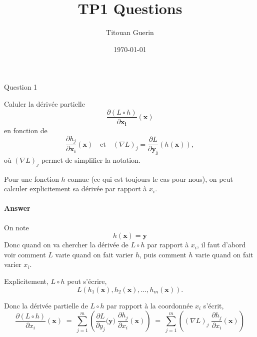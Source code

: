 \documentclass[12pt,a4paper]{article}
\title{TP1 Questions}
\author{Titouan Guerin}
\date{\today}
\begin{document}
\begin{section}{Question 1}

Caluler la dérivée partielle 
\[
\frac{\partial (L \circ h)}{\partial \mathbf{x_i}}(\mathbf{x})
\]
en fonction de 
\[
\frac{\partial h_j}{\partial \mathbf{x_i}}(\mathbf{x})
\quad \text{et} \quad
(\nabla L)_j = \frac{\partial L}{\partial \mathbf{y_j}}(h(\mathbf{x})),
\]
où $(\nabla L)_j$ permet de simplifier la notation. 

Pour une fonction $h$ connue (ce qui est toujours le cas pour nous), on peut calculer explicitement sa dérivée par rapport à $x_i$.

\paragraph{Answer}

On note
\[ h(\mathbf{x}) = \mathbf{y}\]
Donc quand on va chercher la dérivée de \(L\circ h\) par rapport à \(x_i\), 
il faut d'abord voir comment \(L\) varie quand on fait varier \(h\),
puis comment \(h\) varie quand on fait varier \(x_i\).

Explicitement, \(L\circ h\) peut s'écrire,
\[
L(h_1(\mathbf{x}), h_2(\mathbf{x}), \ldots, h_m(\mathbf{x})).
\]

Donc la dérivée partielle de \(L\circ h\) par rapport à la coordonnée \(x_i\) s'écrit,
\[
\frac{\partial (L\circ h)}{\partial x_i}(\mathbf{x})
\;=\;
\sum_{j=1}^{m} \left( \frac{\partial L}{\partial y_j}\big(\mathbf{y}\big)\;
\frac{\partial h_j}{\partial x_i}(\mathbf{x}) \right)
\;=\;
\sum_{j=1}^{m} \left( (\nabla L)_j\; \frac{\partial h_j}{\partial x_i}(\mathbf{x}) \right)
\]

\end{section}
\end{document}
